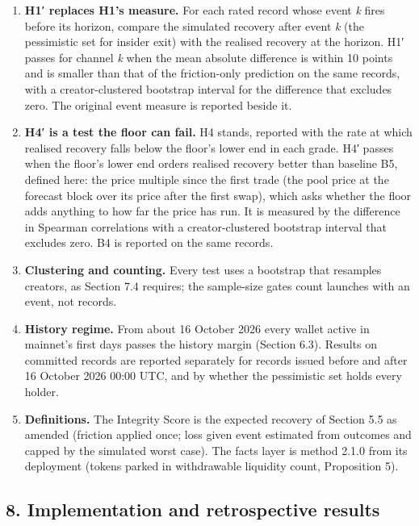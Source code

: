 \begin{enumerate}
\def\labelenumi{\arabic{enumi}.}
\tightlist
\item
  \textbf{H1′ replaces H1's measure.} For each rated record whose event \emph{k} fires before its horizon, compare the simulated recovery after event \emph{k} (the pessimistic set for insider exit) with the realised recovery at the horizon. H1′ passes for channel \emph{k} when the mean absolute difference is within 10 points and is smaller than that of the friction-only prediction on the same records, with a creator-clustered bootstrap interval for the difference that excludes zero. The original event measure is reported beside it.
\item
  \textbf{H4′ is a test the floor can fail.} H4 stands, reported with the rate at which realised recovery falls below the floor's lower end in each grade. H4′ passes when the floor's lower end orders realised recovery better than baseline B5, defined here: the price multiple since the first trade (the pool price at the forecast block over its price after the first swap), which asks whether the floor adds anything to how far the price has run. It is measured by the difference in Spearman correlations with a creator-clustered bootstrap interval that excludes zero. B4 is reported on the same records.
\item
  \textbf{Clustering and counting.} Every test uses a bootstrap that resamples creators, as Section 7.4 requires; the sample-size gates count launches with an event, not records.
\item
  \textbf{History regime.} From about 16 October 2026 every wallet active in mainnet's first days passes the history margin (Section 6.3). Results on committed records are reported separately for records issued before and after 16 October 2026 00:00 UTC, and by whether the pessimistic set holds every holder.
\item
  \textbf{Definitions.} The Integrity Score is the expected recovery of Section 5.5 as amended (friction applied once; loss given event estimated from outcomes and capped by the simulated worst case). The facts layer is method 2.1.0 from its deployment (tokens parked in withdrawable liquidity count, Proposition 5).
\end{enumerate}

\subsection{8. Implementation and retrospective results}\label{implementation-and-retrospective-results}

